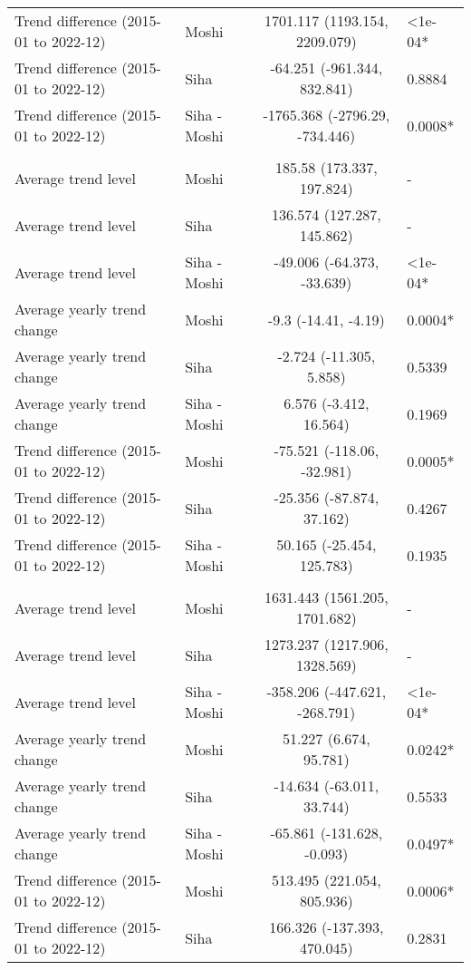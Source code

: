 \begin{longtable}{l|lcl}
Trend difference (2015-01 to 2022-12) & Moshi & 1701.117 (1193.154, 2209.079) & <1e-04* \\ 
Trend difference (2015-01 to 2022-12) & Siha & -64.251 (-961.344, 832.841) & 0.8884 \\ 
Trend difference (2015-01 to 2022-12) & Siha - Moshi & -1765.368 (-2796.29, -734.446) & 0.0008* \\ 
\midrule\addlinespace[2.5pt]
\multicolumn{4}{l}{Trauma} \\[2.5pt] 
\midrule\addlinespace[2.5pt]
Average trend level & Moshi & 185.58 (173.337, 197.824) & - \\ 
Average trend level & Siha & 136.574 (127.287, 145.862) & - \\ 
Average trend level & Siha - Moshi & -49.006 (-64.373, -33.639) & <1e-04* \\ 
Average yearly trend change & Moshi & -9.3 (-14.41, -4.19) & 0.0004* \\ 
Average yearly trend change & Siha & -2.724 (-11.305, 5.858) & 0.5339 \\ 
Average yearly trend change & Siha - Moshi & 6.576 (-3.412, 16.564) & 0.1969 \\ 
Trend difference (2015-01 to 2022-12) & Moshi & -75.521 (-118.06, -32.981) & 0.0005* \\ 
Trend difference (2015-01 to 2022-12) & Siha & -25.356 (-87.874, 37.162) & 0.4267 \\ 
Trend difference (2015-01 to 2022-12) & Siha - Moshi & 50.165 (-25.454, 125.783) & 0.1935 \\ 
\midrule\addlinespace[2.5pt]
\multicolumn{4}{l}{Urinary Infections} \\[2.5pt] 
\midrule\addlinespace[2.5pt]
Average trend level & Moshi & 1631.443 (1561.205, 1701.682) & - \\ 
Average trend level & Siha & 1273.237 (1217.906, 1328.569) & - \\ 
Average trend level & Siha - Moshi & -358.206 (-447.621, -268.791) & <1e-04* \\ 
Average yearly trend change & Moshi & 51.227 (6.674, 95.781) & 0.0242* \\ 
Average yearly trend change & Siha & -14.634 (-63.011, 33.744) & 0.5533 \\ 
Average yearly trend change & Siha - Moshi & -65.861 (-131.628, -0.093) & 0.0497* \\ 
Trend difference (2015-01 to 2022-12) & Moshi & 513.495 (221.054, 805.936) & 0.0006* \\ 
Trend difference (2015-01 to 2022-12) & Siha & 166.326 (-137.393, 470.045) & 0.2831 \\ 

\end{longtable}
